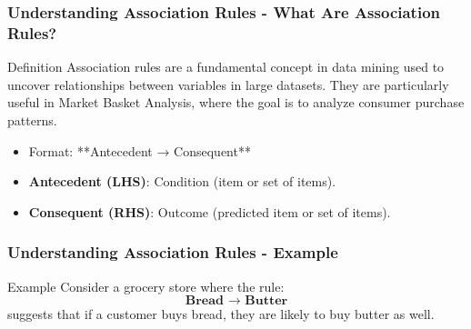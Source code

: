 \documentclass[aspectratio=169]{beamer}
\begin{document}
\begin{frame}[fragile]
    \frametitle{Understanding Association Rules - What Are Association Rules?}
    \begin{block}{Definition}
        Association rules are a fundamental concept in data mining used to uncover relationships between variables in large datasets. 
        They are particularly useful in Market Basket Analysis, where the goal is to analyze consumer purchase patterns.
    \end{block}
    \begin{itemize}
        \item Format: **{Antecedent} → {Consequent}**
        \item \textbf{Antecedent (LHS)}: Condition (item or set of items).
        \item \textbf{Consequent (RHS)}: Outcome (predicted item or set of items).
    \end{itemize}
\end{frame}

\begin{frame}[fragile]
    \frametitle{Understanding Association Rules - Example}
    \begin{block}{Example}
        Consider a grocery store where the rule:
        \[
        \textbf{{Bread} → {Butter}}
        \]
        suggests that if a customer buys bread, they are likely to buy butter as well.
    \end{block}
\end{frame}
\end{document}
